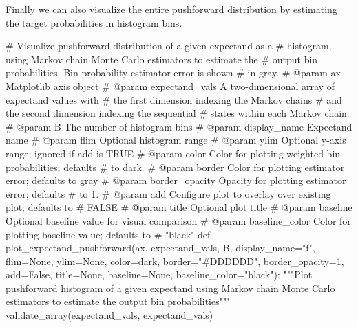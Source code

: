 \documentclass[
  letterpaper,
  DIV=11,
  numbers=noendperiod]{scrartcl}
\newenvironment{Shaded}{\begin{snugshade}}{\end{snugshade}}
\newcommand{\CommentTok}[1]{\textcolor[rgb]{0.37,0.37,0.37}{#1}}
\newcommand{\DecValTok}[1]{\textcolor[rgb]{0.68,0.00,0.00}{#1}}
\newcommand{\KeywordTok}[1]{\textcolor[rgb]{0.00,0.23,0.31}{#1}}
\newcommand{\NormalTok}[1]{\textcolor[rgb]{0.00,0.23,0.31}{#1}}
\newcommand{\OperatorTok}[1]{\textcolor[rgb]{0.37,0.37,0.37}{#1}}
\newcommand{\StringTok}[1]{\textcolor[rgb]{0.13,0.47,0.30}{#1}}
\newcommand{\VariableTok}[1]{\textcolor[rgb]{0.07,0.07,0.07}{#1}}
\begin{document}
Finally we can also visualize the entire pushforward distribution by
estimating the target probabilities in histogram bins.

\begin{Shaded}
\begin{Highlighting}[]
\CommentTok{\# Visualize pushforward distribution of a given expectand as a}
\CommentTok{\# histogram, using Markov chain Monte Carlo estimators to estimate the}
\CommentTok{\# output bin probabilities.  Bin probability estimator error is shown}
\CommentTok{\# in gray.}
\CommentTok{\# @param ax Matplotlib axis object}
\CommentTok{\# @param expectand\_vals A two{-}dimensional array of expectand values with}
\CommentTok{\#                       the first dimension indexing the Markov chains}
\CommentTok{\#                       and the second dimension indexing the sequential}
\CommentTok{\#                       states within each Markov chain.}
\CommentTok{\# @param B The number of histogram bins}
\CommentTok{\# @param display\_name Expectand name}
\CommentTok{\# @param flim Optional histogram range}
\CommentTok{\# @param ylim Optional y{-}axis range; ignored if add is TRUE}
\CommentTok{\# @param color Color for plotting weighted bin probabilities; defaults}
\CommentTok{\#              to dark.}
\CommentTok{\# @param border Color for plotting estimator error; defaults to gray}
\CommentTok{\# @param border\_opacity Opacity for plotting estimator error; defaults}
\CommentTok{\#                       to 1.}
\CommentTok{\# @param add Configure plot to overlay over existing plot; defaults to}
\CommentTok{\#            FALSE}
\CommentTok{\# @param title Optional plot title}
\CommentTok{\# @param baseline Optional baseline value for visual comparison}
\CommentTok{\# @param baseline\_color Color for plotting baseline value; defaults to}
\CommentTok{\#                       "black"}
\KeywordTok{def}\NormalTok{ plot\_expectand\_pushforward(ax, expectand\_vals, B, display\_name}\OperatorTok{=}\StringTok{"f"}\NormalTok{,}
\NormalTok{                               flim}\OperatorTok{=}\VariableTok{None}\NormalTok{, ylim}\OperatorTok{=}\VariableTok{None}\NormalTok{,}
\NormalTok{                               color}\OperatorTok{=}\NormalTok{dark, border}\OperatorTok{=}\StringTok{"\#DDDDDD"}\NormalTok{,}
\NormalTok{                               border\_opacity}\OperatorTok{=}\DecValTok{1}\NormalTok{,}
\NormalTok{                               add}\OperatorTok{=}\VariableTok{False}\NormalTok{, title}\OperatorTok{=}\VariableTok{None}\NormalTok{,}
\NormalTok{                               baseline}\OperatorTok{=}\VariableTok{None}\NormalTok{, baseline\_color}\OperatorTok{=}\StringTok{"black"}\NormalTok{):}
  \CommentTok{"""Plot pushforward histogram of a given expectand using Markov chain}
\CommentTok{     Monte Carlo estimators to estimate the output bin probabilities"""}
\NormalTok{  validate\_array(expectand\_vals, }\StringTok{\textquotesingle{}expectand\_vals\textquotesingle{}}\NormalTok{)}


\end{Highlighting}
\end{Shaded}
\end{document}
